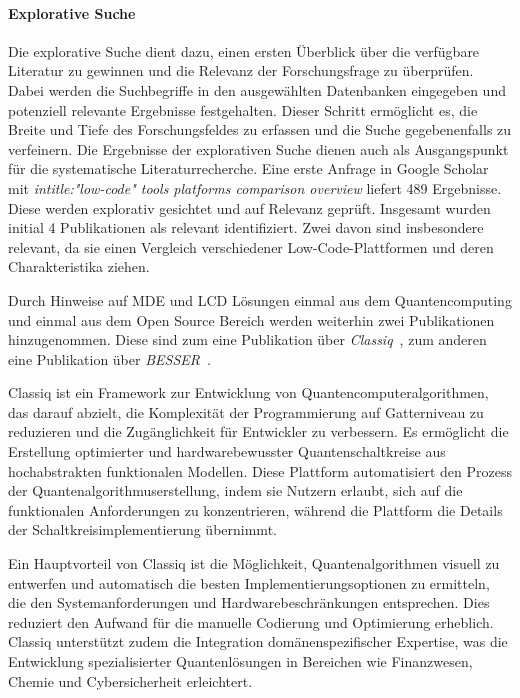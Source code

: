 \paragraph{Explorative Suche}
Die explorative Suche dient dazu, einen ersten Überblick über die verfügbare Literatur zu gewinnen und 
die Relevanz der Forschungsfrage zu überprüfen. Dabei werden die Suchbegriffe in den ausgewählten 
Datenbanken eingegeben und potenziell relevante Ergebnisse festgehalten. Dieser Schritt ermöglicht es, 
die Breite und Tiefe des Forschungsfeldes zu erfassen und die Suche gegebenenfalls zu verfeinern. 
Die Ergebnisse der explorativen Suche dienen auch als Ausgangspunkt für die systematische Literaturrecherche. 
Eine erste Anfrage in Google Scholar mit \textit{intitle:"low-code" tools platforms comparison overview} liefert 489 
Ergebnisse. Diese werden explorativ gesichtet und auf Relevanz geprüft. Insgesamt wurden initial 4 Publikationen 
als relevant identifiziert. Zwei davon sind insbesondere relevant, da sie einen Vergleich verschiedener 
Low-Code-Plattformen und deren Charakteristika ziehen. 

Durch Hinweise auf MDE und LCD Lösungen einmal aus dem Quantencomputing und einmal aus dem Open Source Bereich werden 
weiterhin zwei Publikationen hinzugenommen. Diese sind zum eine Publikation über \textit{Classiq}~\cite{minerbi2022quantum}, zum anderen 
eine Publikation über \textit{BESSER}~\cite{alfonso2024building}. 

Classiq ist ein Framework zur Entwicklung von Quantencomputeralgorithmen, das darauf abzielt, die Komplexität der Programmierung 
auf Gatterniveau zu reduzieren und die Zugänglichkeit für Entwickler zu verbessern. Es ermöglicht die Erstellung optimierter und 
hardwarebewusster Quantenschaltkreise aus hochabstrakten funktionalen Modellen. Diese Plattform automatisiert den Prozess der 
Quantenalgorithmuserstellung, indem sie Nutzern erlaubt, sich auf die funktionalen Anforderungen zu konzentrieren, während die 
Plattform die Details der Schaltkreisimplementierung übernimmt.

Ein Hauptvorteil von Classiq ist die Möglichkeit, Quantenalgorithmen visuell zu entwerfen und automatisch die besten Implementierungsoptionen 
zu ermitteln, die den Systemanforderungen und Hardwarebeschränkungen entsprechen. Dies reduziert den Aufwand für die manuelle Codierung und 
Optimierung erheblich. Classiq unterstützt zudem die Integration domänenspezifischer Expertise, was die Entwicklung spezialisierter 
Quantenlösungen in Bereichen wie Finanzwesen, Chemie und Cybersicherheit erleichtert.

